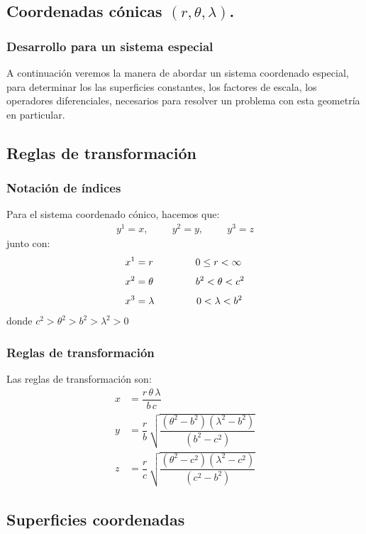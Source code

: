 \documentclass[12pt]{beamer}
\begin{document}
\subsection{Coordenadas cónicas \texorpdfstring{$(r, \theta, \lambda)$}{(r, t, l)}.}

\begin{frame}
\frametitle{Desarrollo para un sistema especial}
A continuación veremos la manera de abordar un sistema coordenado especial, para determinar los las superficies constantes, los factores de escala, los operadores diferenciales, necesarios para resolver un problema con esta geometría en particular.
\end{frame}

\subsection{Reglas de transformación}
\begin{frame}
\frametitle{Notación de índices}
Para el sistema coordenado cónico, hacemos que:
\pause
\begin{align*}
y^{1} = x, \hspace{1cm} y^{2} = y, \hspace{1cm} y^{3} = z
\end{align*}
\pause
junto con:
\begin{align*}
x^{1} &= r \hspace{1.5cm} 0 \leq r < \infty \\[0.35em]
x^{2} &= \theta \hspace{1.5cm} b^{2} < \theta < c^{2} \\[0.35em]
x^{3} &= \lambda \hspace{1.5cm} 0 < \lambda < b^{2}
\end{align*}
donde $c^{2} > \theta^{2} > b^{2} > \lambda^{2} > 0$
\end{frame}
\begin{frame}
\frametitle{Reglas de transformación}
Las reglas de transformación son:
\pause
\begin{align*}
x &= \dfrac{r \, \theta \, \lambda}{b \, c} \\[0.5em]
y &= \dfrac{r}{b} \, \sqrt{\dfrac{(\theta^{2} - b^{2})(\lambda^{2} - b^{2})}{(b^{2} - c^{2})}} \\[0.5em]
z &= \dfrac{r}{c} \, \sqrt{\dfrac{(\theta^{2} - c^{2})(\lambda^{2} - c^{2})}{(c^{2} - b^{2})}}
\end{align*}
\end{frame}

\subsection{Superficies coordenadas}
\end{document}
